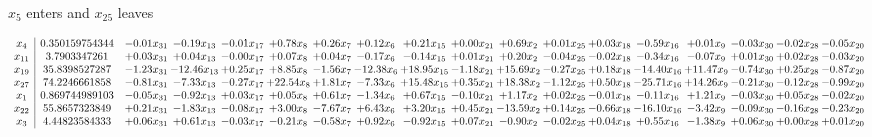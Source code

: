 \documentclass[9pt]{article}
\begin{document}
 $ x_{5} $ enters and $ x_{25} $ leaves 

 \[\begin{array}{c| c c@{\hskip 2pt} c@{\hskip 2pt} c@{\hskip 2pt} c@{\hskip 2pt} c@{\hskip 2pt} c@{\hskip 2pt} c@{\hskip 2pt} c@{\hskip 2pt} c@{\hskip 2pt} c@{\hskip 2pt} c@{\hskip 2pt} c@{\hskip 2pt} c@{\hskip 2pt} c@{\hskip 2pt} c@{\hskip 2pt} c@{\hskip 2pt} }
 x_{4}   &  0.350159754344 & -0.01 x_{31} & -0.19 x_{13} & -0.01 x_{17} & +  0.78 x_{8} & +  0.26 x_{7} & +  0.12 x_{6} & +  0.21 x_{15} & +  0.00 x_{21} & +  0.69 x_{2} & +  0.01 x_{25} & +  0.03 x_{18} & -0.59 x_{16} & +  0.01 x_{9} & -0.03 x_{30} & -0.02 x_{28} & -0.05 x_{20}\\
 x_{11}   &  3.7903347261 & +  0.03 x_{31} & +  0.04 x_{13} & -0.00 x_{17} & +  0.07 x_{8} & +  0.04 x_{7} & -0.17 x_{6} & -0.14 x_{15} & +  0.01 x_{21} & +  0.20 x_{2} & -0.04 x_{25} & -0.02 x_{18} & -0.34 x_{16} & -0.07 x_{9} & +  0.01 x_{30} & +  0.02 x_{28} & -0.03 x_{20}\\
 x_{19}   &  35.8398527287 & -1.23 x_{31} & -12.46 x_{13} & +  0.25 x_{17} & +  8.85 x_{8} & -1.56 x_{7} & -12.38 x_{6} & + 18.95 x_{15} & -1.18 x_{21} & + 15.69 x_{2} & -0.27 x_{25} & +  0.18 x_{18} & -14.40 x_{16} & + 11.47 x_{9} & -0.74 x_{30} & +  0.25 x_{28} & -0.87 x_{20}\\
 x_{27}   &  74.2246661858 & -0.81 x_{31} & -7.33 x_{13} & -0.27 x_{17} & + 22.54 x_{8} & +  1.81 x_{7} & -7.33 x_{6} & + 15.48 x_{15} & +  0.35 x_{21} & + 18.38 x_{2} & -1.12 x_{25} & +  0.50 x_{18} & -25.71 x_{16} & + 14.26 x_{9} & -0.21 x_{30} & -0.12 x_{28} & -0.99 x_{20}\\
 x_{1}   &  0.869744989103 & -0.05 x_{31} & -0.92 x_{13} & +  0.03 x_{17} & +  0.05 x_{8} & +  0.61 x_{7} & -1.34 x_{6} & +  0.67 x_{15} & -0.10 x_{21} & +  1.17 x_{2} & +  0.02 x_{25} & -0.01 x_{18} & -0.11 x_{16} & +  1.21 x_{9} & -0.03 x_{30} & +  0.05 x_{28} & -0.02 x_{20}\\
 x_{22}   &  55.8657323849 & +  0.21 x_{31} & -1.83 x_{13} & -0.08 x_{17} & +  3.00 x_{8} & -7.67 x_{7} & +  6.43 x_{6} & +  3.20 x_{15} & +  0.45 x_{21} & -13.59 x_{2} & +  0.14 x_{25} & -0.66 x_{18} & -16.10 x_{16} & -3.42 x_{9} & -0.09 x_{30} & -0.16 x_{28} & -0.23 x_{20}\\
 x_{3}   &  4.44823584333 & +  0.06 x_{31} & +  0.61 x_{13} & -0.03 x_{17} & -0.21 x_{8} & -0.58 x_{7} & +  0.92 x_{6} & -0.92 x_{15} & +  0.07 x_{21} & -0.90 x_{2} & -0.02 x_{25} & +  0.04 x_{18} & +  0.55 x_{16} & -1.38 x_{9} & +  0.06 x_{30} & +  0.00 x_{28} & +  0.01 x_{20}\\

\end{array}\]
\end{document}
